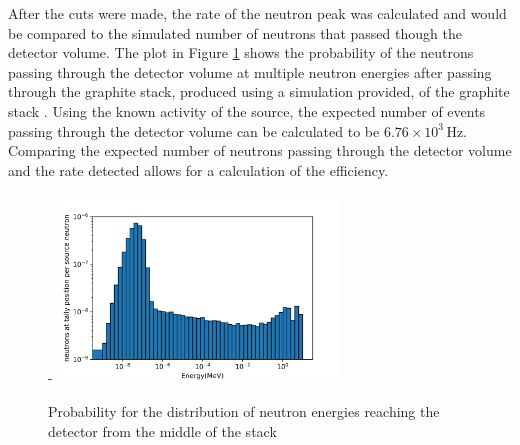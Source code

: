 \documentclass[a4paper]{article}
\begin{document}
\noindent After the cuts were made, the rate of the neutron peak was calculated and would be compared to the simulated number of neutrons that passed though the detector volume. The plot in Figure \ref{fig:prob} shows the probability of the neutrons passing through the detector volume at multiple neutron energies after passing through the graphite stack, produced using a simulation provided, of the graphite stack \cite{Ben}. Using the known activity of the source, the expected number of events passing through the detector volume can be calculated to be  $6.76 \times 10^3$\,Hz. Comparing the expected number of neutrons passing through the detector volume and the rate detected allows for a calculation of the efficiency.
\begin{figure}[H]-
    \centering
    \includegraphics[height=5cm]{plots/hist.png}
    \caption{Probability for the distribution of neutron energies reaching the detector from the middle of the stack \cite{Ben}}
    \label{fig:prob}
\end{figure}
\end{document}
